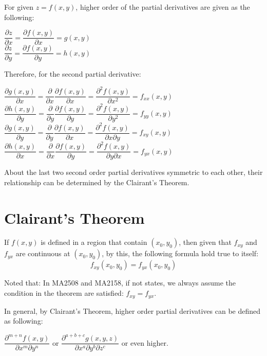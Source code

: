 \documentclass[UTF8,a4paper, 10pt, openany]{svmono}
\begin{document}
For given $z=f(x,y)$, higher order of the partial derivatives are given as the following:

\begin{center}
$\dfrac{\partial z}{\partial x}=\dfrac{\partial f(x,y)}{\partial x}=g(x,y)$\\
$\dfrac{\partial z}{\partial y}=\dfrac{\partial f(x,y)}{\partial y}=h(x,y)$
\end{center}

Therefore, for the second partial derivative:

\begin{center}
$\dfrac{\partial g(x,y)}{\partial x}=\dfrac{\partial}{\partial x}\dfrac{\partial f(x,y)}{\partial x}=\dfrac{\partial^2 f(x,y)}{\partial x^2}=f_{xx}(x,y)$\\
$\dfrac{\partial h(x,y)}{\partial y}=\dfrac{\partial}{\partial y}\dfrac{\partial f(x,y)}{\partial y}=\dfrac{\partial^2 f(x,y)}{\partial y^2}=f_{yy}(x,y)$\\
$\dfrac{\partial g(x,y)}{\partial y}=\dfrac{\partial}{\partial y}\dfrac{\partial f(x,y)}{\partial x}=\dfrac{\partial^2 f(x,y)}{\partial x\partial y}=f_{xy}(x,y)$\\
$\dfrac{\partial h(x,y)}{\partial x}=\dfrac{\partial}{\partial x}\dfrac{\partial f(x,y)}{\partial y}=\dfrac{\partial^2 f(x,y)}{\partial y\partial x}=f_{yx}(x,y)$
\end{center}

About the last two second order partial derivatives symmetric to each other, their relationship can be determined by the Clairant's Theorem.

\section{Clairant's Theorem}
If $f(x,y)$ is defined in a region that contain $(x_0,y_0)$, then given that $f_{xy}$ and $f_{yx}$ are continuous at $(x_0,y_0)$, by this, the following formula hold true to itself:
\begin{equation}
\boxed{f_{xy}(x_0,y_0)=f_{yx}(x_0,y_0)}
\end{equation}

Noted that: In MA2508 and MA2158, if not states, we always assume the condition in the theorem are satisfied: $f_{xy}=f_{yx}$.

In general, by Clairant's Theorem, higher order partial derivatives can be defined as following:
\begin{center}
$\dfrac{\partial^{m+n}f(x,y)}{\partial x^m \partial y^n}$ or $\dfrac{\partial^{a+b+c}g(x,y,z)}{\partial x^a \partial y^b \partial z^c}$ or even higher.
\end{center}
\end{document}
